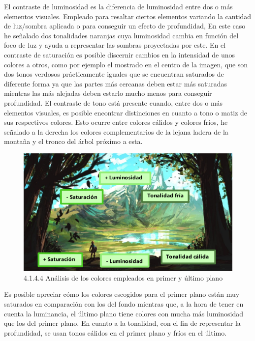 \documentclass[12pt]{article}
\begin{document}
    El contraste de luminosidad es la diferencia de luminosidad entre dos o más elementos visuales. Empleado para resaltar ciertos elementos variando la cantidad de luz/sombra aplicada o para conseguir un efecto de profundidad, En este caso he señalado dos tonalidades naranjas cuya luminosidad cambia en función del foco de luz y ayuda a representar las sombras proyectadas por este. En el contraste de saturación es posible discernir cambios en la intensidad de unos colores a otros, como por ejemplo el mostrado en el centro de la imagen, que son dos tonos verdosos prácticamente iguales que se encuentran saturados de diferente forma ya que las partes más cercanas deben estar más saturadas mientras las más alejadas deben estarlo mucho menos para conseguir profundidad. El contraste de tono está presente cuando, entre dos o más elementos visuales, es posible encontrar distinciones en cuanto a tono o matiz de sus respectivos colores. Esto ocurre entre colores cálidos y colores fríos, he señalado a la derecha los colores complementarios de la lejana ladera de la montaña y el tronco del árbol próximo a esta.

    \begin{figure}[H]
      \centering
      \includegraphics[width=\textwidth]{images/Nerea/Nerea Zelda concept 144.PNG}
      \caption{\small 4.1.4.4 Análisis de los colores empleados en primer y último plano}
    \end{figure}

    Es posible apreciar cómo los colores escogidos para el primer plano están muy saturados en comparación con los del fondo mientras que, a la hora de tener en cuenta la luminancia, el último plano tiene colores con mucha más luminosidad que los del primer plano. En cuanto a la tonalidad, con el fin de representar la profundidad, se usan tonos cálidos en el primer plano y fríos en el último.
        \newpage
\end{document}
